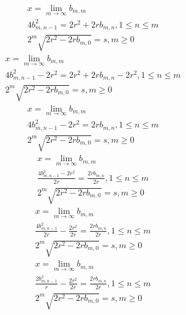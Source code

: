 \documentclass[a4paper,12pt]{report}
\begin{document}
\begin{subequations}
\begin{gather}
x = \lim \limits_{m \to \infty} b_{m,m} \\
4b_{m,n-1}^2 = 2r^2 + 2rb_{m,n}, 1 \leq n \leq m \\
2^m \sqrt{2r^2 - 2rb_{m,0}} = s, m \geq 0
\end{gather}
\end{subequations}
\begin{subequations}
\begin{gather}
x = \lim \limits_{m \to \infty} b_{m,m} \\
4b_{m,n-1}^2 - 2r^2 = 2r^2 + 2rb_{m,n} - 2r^2, 1 \leq n \leq m \\
2^m \sqrt{2r^2 - 2rb_{m,0}} = s, m \geq 0
\end{gather}
\end{subequations}
\begin{subequations}
\begin{gather}
x = \lim \limits_{m \to \infty} b_{m,m} \\
4b_{m,n-1}^2 - 2r^2 = 2rb_{m,n}, 1 \leq n \leq m \\
2^m \sqrt{2r^2 - 2rb_{m,0}} = s, m \geq 0
\end{gather}
\end{subequations}
\begin{subequations}
\begin{gather}
x = \lim \limits_{m \to \infty} b_{m,m} \\
\frac{4b_{m,n-1}^2 - 2r^2}{2r} = \frac{2rb_{m,n}}{2r}, 1 \leq n \leq m \\
2^m \sqrt{2r^2 - 2rb_{m,0}} = s, m \geq 0
\end{gather}
\end{subequations}
\begin{subequations}
\begin{gather}
x = \lim \limits_{m \to \infty} b_{m,m} \\
\frac{4b_{m,n-1}^2}{2r} - \frac{2r^2}{2r} = \frac{2rb_{m,n}}{2r}, 1 \leq n \leq m \\
2^m \sqrt{2r^2 - 2rb_{m,0}} = s, m \geq 0
\end{gather}
\end{subequations}
\begin{subequations}
\begin{gather}
x = \lim \limits_{m \to \infty} b_{m,m} \\
\frac{2b_{m,n-1}^2}{r} - \frac{2r^2}{2r} = \frac{2rb_{m,n}}{2r}, 1 \leq n \leq m \\
2^m \sqrt{2r^2 - 2rb_{m,0}} = s, m \geq 0
\end{gather}
\end{subequations}
\end{document}
